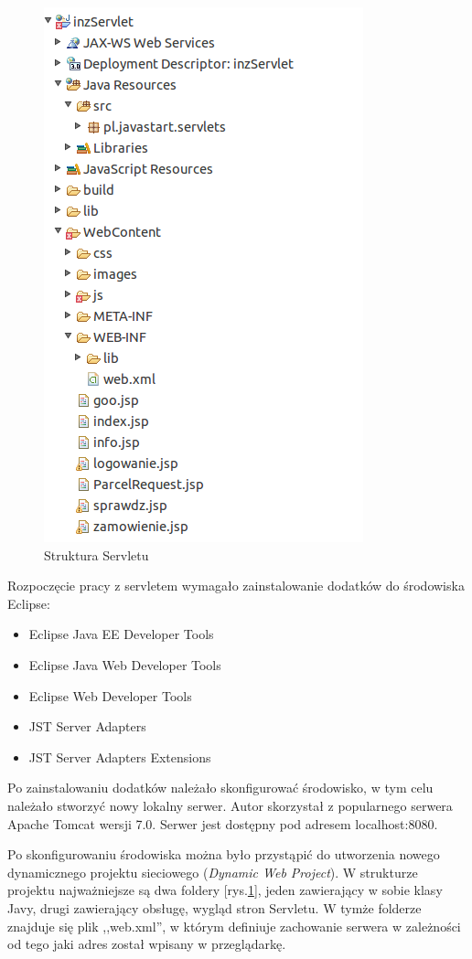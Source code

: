 \documentclass[eng,printmode,oneside]{mgr}
\begin{document}
\begin{figure}
\centering
\captionsetup{justification=centering,margin=0cm}
\vspace{-10pt}
\begin{center}
\includegraphics[width=.3\textwidth]{strukturaServlet.png}
\end{center}
\vspace{-10pt}
  \caption{Struktura Servletu}
\label{servlet}
\vspace{-60pt}
\end{figure}

Rozpoczęcie pracy z servletem wymagało zainstalowanie dodatków do środowiska
Eclipse:
\begin{itemize}
  \item Eclipse Java EE Developer Tools
  \item Eclipse Java Web Developer Tools
  \item Eclipse Web Developer Tools
  \item JST Server Adapters
  \item JST Server Adapters Extensions
\end{itemize}
Po zainstalowaniu dodatków należało skonfigurować środowisko, w tym celu należało
stworzyć nowy lokalny serwer. Autor skorzystał z popularnego serwera Apache
Tomcat wersji 7.0. Serwer jest dostępny pod adresem localhost:8080. 

Po skonfigurowaniu środowiska można było przystąpić do utworzenia nowego
dynamicznego projektu sieciowego (\textsl{Dynamic Web Project}). W strukturze
projektu najważniejsze są dwa foldery [rys.\ref{servlet}], jeden zawierający w
sobie klasy Javy, drugi zawierający obsługę, wygląd stron Servletu. W tymże
folderze znajduje się plik ,,web.xml'', w którym definiuje zachowanie serwera w
zależności od tego jaki adres został wpisany w przeglądarkę. 
\end{document}
